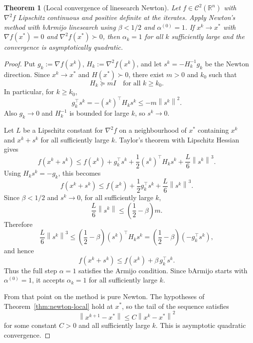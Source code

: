 \documentclass[11pt,a4paper]{report}
\theoremstyle{plain}
\newtheorem{theorem}{Theorem}[chapter]
\theoremstyle{definition}
\newcommand{\R}{\mathbb{R}}
\newcommand{\norm}[1]{\left\lVert#1\right\rVert}
\newcommand{\grad}{\nabla}
\newcommand{\hess}{\nabla^{2}}
\newcommand{\trans}{^{\top}}
\begin{document}
\begin{theorem}[Local convergence of linesearch Newton]\label{thm:newton-armijo}
Let $f\in\mathcal{C}^{2}(\R^{n})$ with $\hess f$ Lipschitz continuous and positive
definite at the iterates. Apply Newton's method with bArmijo linesearch using
$\beta<1/2$ and $\alpha^{(0)}=1$. If $x^{k}\to x^{*}$ with $\grad f(x^{*})=0$ and
$\hess f(x^{*})\succ 0$, then $\alpha_{k}=1$ for all $k$ sufficiently large and
the convergence is asymptotically quadratic.
\end{theorem}
\begin{proof}
  Put $g_{k}:=\grad f(x^{k})$, $H_{k}:=\hess f(x^{k})$, and let
  $s^{k}=-H_{k}^{-1}g_{k}$ be the Newton direction. Since
  $x^{k}\to x^{*}$ and $H(x^{*})\succ0$, there exist $m>0$ and $k_{0}$ such that
  \[
    H_{k}\succeq m I
    \quad\text{for all }k\ge k_{0}.
  \]
  In particular, for $k\ge k_{0}$,
  \[
    g_{k}\trans s^{k}=-(s^{k})\trans H_{k}s^{k}
    \le -m\norm{s^{k}}^{2}.
  \]
  Also $g_{k}\to0$ and $H_{k}^{-1}$ is bounded for large $k$, so
  $s^{k}\to0$.

  Let $L$ be a Lipschitz constant for $\hess f$ on a neighbourhood of $x^{*}$
  containing $x^{k}$ and $x^{k}+s^{k}$ for all sufficiently large $k$. Taylor's
  theorem with Lipschitz Hessian gives
  \[
    f(x^{k}+s^{k})
    \le f(x^{k})+g_{k}\trans s^{k}
      +\frac12 (s^{k})\trans H_{k}s^{k}
      +\frac{L}{6}\norm{s^{k}}^{3}.
  \]
  Using $H_{k}s^{k}=-g_{k}$, this becomes
  \[
    f(x^{k}+s^{k})
    \le f(x^{k})+\frac12 g_{k}\trans s^{k}
      +\frac{L}{6}\norm{s^{k}}^{3}.
  \]
  Since $\beta<1/2$ and $s^{k}\to0$, for all sufficiently large $k$,
  \[
    \frac{L}{6}\norm{s^{k}}
    \le \left(\frac12-\beta\right)m.
  \]
  Therefore
  \[
    \frac{L}{6}\norm{s^{k}}^{3}
    \le \left(\frac12-\beta\right)(s^{k})\trans H_{k}s^{k}
    = \left(\frac12-\beta\right)(-g_{k}\trans s^{k}),
  \]
  and hence
  \[
    f(x^{k}+s^{k})
    \le f(x^{k})+\beta\, g_{k}\trans s^{k}.
  \]
  Thus the full step $\alpha=1$ satisfies the Armijo condition. Since bArmijo
  starts with $\alpha^{(0)}=1$, it accepts $\alpha_{k}=1$ for all sufficiently
  large $k$.

  From that point on the method is pure Newton. The hypotheses of
  Theorem~\ref{thm:newton-local} hold at $x^{*}$, so the tail of the sequence
  satisfies
  \[
    \norm{x^{k+1}-x^{*}}\le C\norm{x^{k}-x^{*}}^{2}
  \]
  for some constant $C>0$ and all sufficiently large $k$. This is asymptotic
  quadratic convergence.
\end{proof}
\end{document}
